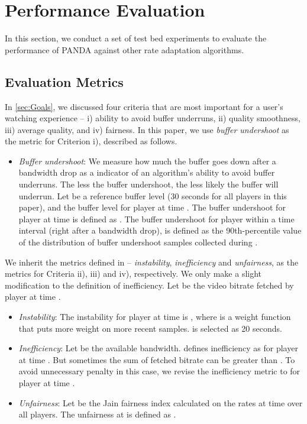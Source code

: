 \documentclass[conference]{IEEEtran}
\theoremstyle{plain}
\theoremstyle{definition}
\theoremstyle{plain}
\theoremstyle{plain}
\begin{document}
\section{Performance Evaluation\label{sec:Experimental-Results}}

In this section, we conduct a set of test bed experiments to evaluate
the performance of PANDA against other rate adaptation algorithms.


\subsection{Evaluation Metrics}

In \ref{sec:Goals}, we discussed four criteria that are most
important for a user's watching experience -- i) ability to avoid
buffer underruns, ii) quality smoothness, iii) average quality, and
iv) fairness. In this paper, we use \emph{buffer undershoot} as the
metric for Criterion i), described as follows.
\begin{itemize}
\item \emph{Buffer undershoot}: We measure how much the buffer goes down
after a bandwidth drop as a indicator of an algorithm's ability to
avoid buffer underruns. The less the buffer undershoot, the less likely
the buffer will underrun. Let  be a reference buffer level
(30 seconds for all players in this paper), and  the buffer
level for player  at time . The buffer undershoot for player
 at time  is defined as .
The buffer undershoot for player  within a time interval 
(right after a bandwidth drop), is defined as the 90th-percentile
value of the distribution of buffer undershoot samples collected during
. 
\end{itemize}
We inherit the metrics defined in \cite{Jiang:CoNext12} -- \emph{instability},
\emph{inefficiency} and \emph{unfairness}, as the metrics for Criteria
ii), iii) and iv), respectively. We only make a slight modification
to the definition of inefficiency. Let  be the video bitrate
fetched by player  at time .
\begin{itemize}
\item \emph{Instability}: The instability for player  at time  is
,
where  is a weight function that puts more weight on more
recent samples.  is selected as 20 seconds.
\item \emph{Inefficiency}: Let  be the available bandwidth. \cite{Jiang:CoNext12}
defines inefficiency as 
for player  at time . But sometimes the sum of fetched bitrate
 can be greater than . To avoid unnecessary
penalty in this case, we revise the inefficiency metric to 
for player  at time .
\item \emph{Unfairness}: Let  be the Jain fairness index
calculated on the rates  at time  over all players.
The unfairness at  is defined as .
\end{itemize}
\end{document}
